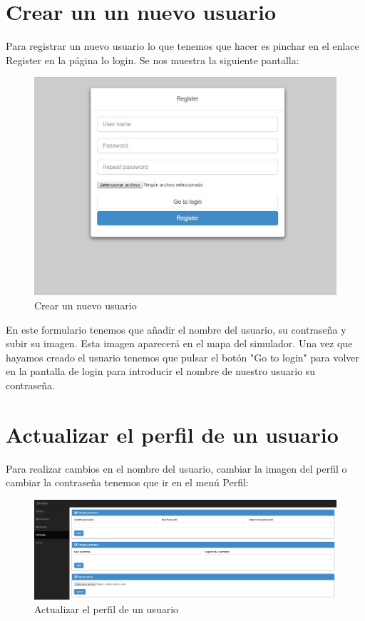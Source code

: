 \section{Crear un un nuevo usuario}\label{sec:CrearUsuario}

Para registrar un nuevo usuario lo que tenemos que hacer es pinchar en el enlace Register en la página lo login. Se nos muestra la siguiente pantalla:

\begin{figure}[H]
	\centering\includegraphics[scale=0.25]{imagenes/capitulo5/register.jpg}
	\caption{Crear un nuevo usuario}
	\label{img:AddUser}
\end{figure}

En este formulario tenemos que añadir el nombre del usuario, su contraseña y subir su imagen. Esta imagen aparecerá en el mapa del simulador. Una vez que hayamos creado el usuario tenemos que pulsar el botón "Go to login" para volver en la pantalla de login para introducir el nombre de nuestro usuario su contraseña.

\section{Actualizar el perfil de un usuario}

Para realizar cambios en el nombre del usuario, cambiar la imagen del perfil o cambiar la contraseña tenemos que ir en el menú Perfil:

\begin{figure}[H]
	\centering\includegraphics[scale=0.25]{imagenes/capitulo6/perfil-del-usuario.jpg}
	\caption{Actualizar el perfil de un usuario}
	\label{img:UpdateUser}
\end{figure}

